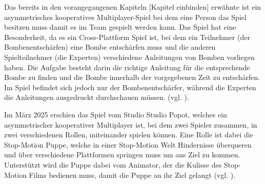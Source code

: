 Das bereits in den vorangegangenen Kapiteln [Kapitel einbinden] erwähnte  ist ein asymmetrisches kooperatives Multiplayer-Spiel bei dem eine Person das Spiel besitzen muss damit es im Team gespielt werden kann. Das Spiel hat eine Besonderheit, da es ein Cross-Plattform Spiel ist, bei dem ein Teilnehmer (der Bombenentschärfen) eine Bombe entschärfen muss und die anderen Spielteilnehmer (die Experten) verschiedene Anleitungen von Bomben vorliegen haben. Die Aufgabe besteht darin die richtige Anleitung für die entsprechende Bombe zu finden und die Bombe innerhalb der vorgegebenen Zeit zu entschärfen. Im Spiel befindet sich jedoch nur der Bombenentschärfer, während die Experten die Anleitungen ausgedruckt durchschauen müssen. (vgl. \cite{noauthor_keep_nodate}).

Im März 2025 erschien das Spiel  vom Studio Studio Popot, welches ein asymmetrischer kooperativer Multiplayer ist, bei dem zwei Spieler zusammen, in zwei verschiedenen Rollen, miteinander spielen können. Eine Rolle ist dabei die Stop-Motion Puppe, welche in einer Stop-Motion Welt Hindernisse überqueren und über verschiedene Plattformen springen muss um ans Ziel zu kommen. Unterstützt wird die Puppe dabei vom Animator, der die Kulisse des Stop-Motion Films bedienen muss, damit die Puppe an ihr Ziel gelangt (vgl. \cite{noauthor_myrmidon_2024}).






